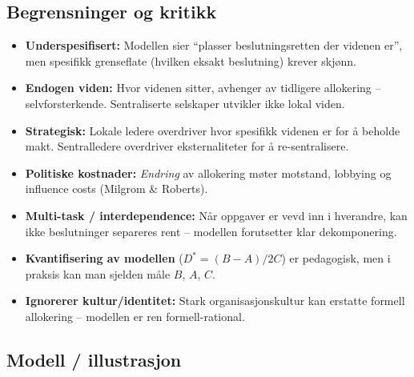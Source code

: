 \subsection*{Begrensninger og kritikk}
\begin{itemize}
\item \textbf{Underspesifisert:} Modellen sier ``plasser beslutningsretten der videnen er'', men spesifikk grenseflate (hvilken eksakt beslutning) krever skjønn.
\item \textbf{Endogen viden:} Hvor videnen sitter, avhenger av tidligere allokering -- selvforsterkende. Sentraliserte selskaper utvikler ikke lokal viden.
\item \textbf{Strategisk:} Lokale ledere overdriver hvor spesifikk videnen er for å beholde makt. Sentralledere overdriver eksternaliteter for å re-sentralisere.
\item \textbf{Politiske kostnader:} \emph{Endring} av allokering møter motstand, lobbying og influence costs (Milgrom \& Roberts).
\item \textbf{Multi-task / interdependence:} Når oppgaver er vevd inn i hverandre, kan ikke beslutninger separeres rent -- modellen forutsetter klar dekomponering.
\item \textbf{Kvantifisering av modellen} ($D^* = (B-A)/2C$) er pedagogisk, men i praksis kan man sjelden måle $B$, $A$, $C$.
\item \textbf{Ignorerer kultur/identitet:} Stark organisasjonskultur kan erstatte formell allokering -- modellen er ren formell-rational.
\end{itemize}

\subsection*{Modell / illustrasjon}

